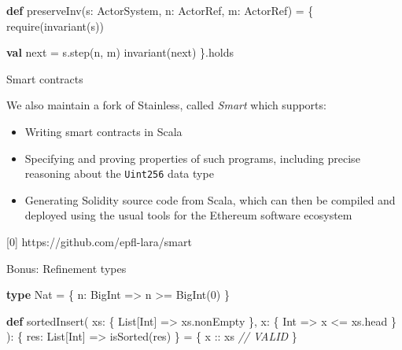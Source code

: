 \documentclass[
  ignorenonframetext,
]{beamer}
\newenvironment{Shaded}{}{}
\newcommand{\CommentTok}[1]{\textcolor[rgb]{0.38,0.63,0.69}{\textit{#1}}}
\newcommand{\DecValTok}[1]{\textcolor[rgb]{0.25,0.63,0.44}{#1}}
\newcommand{\FunctionTok}[1]{\textcolor[rgb]{0.02,0.16,0.49}{#1}}
\newcommand{\KeywordTok}[1]{\textcolor[rgb]{0.00,0.44,0.13}{\textbf{#1}}}
\newcommand{\NormalTok}[1]{#1}
\providecommand{\tightlist}{%
  \setlength{\itemsep}{0pt}\setlength{\parskip}{0pt}}
\begin{document}
\begin{frame}[fragile]

\begin{Shaded}
\begin{Highlighting}[]
\KeywordTok{def} \FunctionTok{preserveInv}\NormalTok{(s: ActorSystem, n: ActorRef, m: ActorRef) = \{}
  \FunctionTok{require}\NormalTok{(}\FunctionTok{invariant}\NormalTok{(s))}

  \KeywordTok{val}\NormalTok{ next = s.}\FunctionTok{step}\NormalTok{(n, m)}
  \FunctionTok{invariant}\NormalTok{(next)}
\NormalTok{\}.}\FunctionTok{holds}
\end{Highlighting}
\end{Shaded}

\end{frame}

\begin{frame}[fragile]{Smart contracts}
\protect\hypertarget{smart-contracts}{}

We also maintain a fork of Stainless, called \emph{Smart} which
supports:

\begin{itemize}
\tightlist
\item
  Writing smart contracts in Scala
\item
  Specifying and proving properties of such programs, including precise
  reasoning about the \texttt{Uint256} data type
\item
  Generating Solidity source code from Scala, which can then be compiled
  and deployed using the usual tools for the Ethereum software ecosystem
\end{itemize}

{[}0{]} https://github.com/epfl-lara/smart

\end{frame}

\begin{frame}[fragile]{Bonus: Refinement types}
\protect\hypertarget{bonus-refinement-types}{}

\begin{Shaded}
\begin{Highlighting}[]
\KeywordTok{type}\NormalTok{ Nat = \{ n: BigInt => n >= }\FunctionTok{BigInt}\NormalTok{(}\DecValTok{0}\NormalTok{) \}}
\end{Highlighting}
\end{Shaded}

\end{frame}

\begin{frame}[fragile]

\begin{Shaded}
\begin{Highlighting}[]
\KeywordTok{def} \FunctionTok{sortedInsert}\NormalTok{(}
\NormalTok{  xs: \{ List[Int] => xs.}\FunctionTok{nonEmpty}\NormalTok{ \},}
\NormalTok{  x:  \{ Int => x <= xs.}\FunctionTok{head}\NormalTok{ \}}
\NormalTok{): \{ res: List[Int] => }\FunctionTok{isSorted}\NormalTok{(res) \} = \{}
\NormalTok{  x :: xs }\CommentTok{// VALID}
\NormalTok{\}}
\end{Highlighting}
\end{Shaded}

\end{frame}
\end{document}

